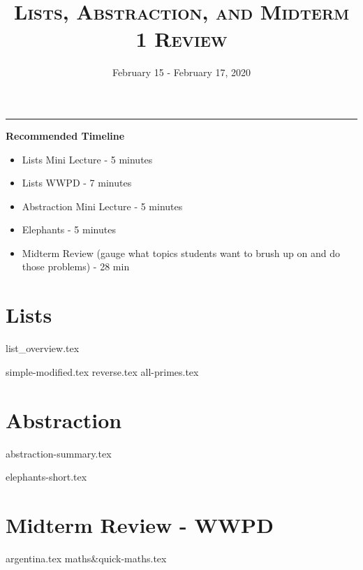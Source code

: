 \documentclass{exam}
\title{\textsc{Lists, Abstraction, and Midterm 1 Review}}
\date{February 15 - February 17, 2020}
\begin{document}
\maketitle
\rule{\textwidth}{0.15em}
\fontsize{12}{15}\selectfont


\begin{guide}
    \textbf{Recommended Timeline}
    \begin{itemize}
        \item Lists Mini Lecture - 5 minutes
        \item Lists WWPD - 7 minutes
        \item Abstraction Mini Lecture - 5 minutes
        \item Elephants - 5 minutes
        \item Midterm Review (gauge what topics students want to brush up on and do those problems) - 28 min
    \end{itemize}
\end{guide}

\section{Lists}
{list_overview.tex}
\begin{questions}
{simple-modified.tex}
{reverse.tex}
{all-primes.tex}
\end{questions}

\newpage
\section{Abstraction}
{abstraction-summary.tex}
\begin{questions}
{elephants-short.tex}
\end{questions}

\section{Midterm Review - WWPD}
\begin{questions}
{argentina.tex}
{maths&quick-maths.tex}
\end{questions}
\end{document}
